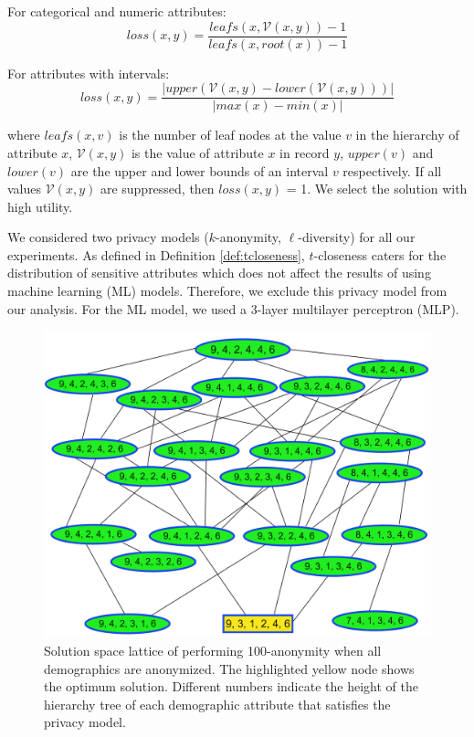 \documentclass{bioinfo}
\begin{document}
\begin{methods}
For categorical and numeric attributes:
$$loss(x,y) = \frac{leafs(x, \mathcal{V}(x,y)) - 1}{leafs(x, root(x)) - 1}$$

For attributes with intervals:
$$loss(x,y) = \frac{|upper(\mathcal{V}(x,y) - lower(\mathcal{V}(x,y)))|}{|max(x) - min(x)|}$$

where $leafs(x,v)$ is the number of leaf nodes at the value $v$ in the hierarchy of attribute $x$, $\mathcal{V}(x,y)$ is the value of attribute $x$ in record $y$, $upper(v)$ and $lower(v)$ are the upper and lower bounds of an interval $v$ respectively. If all values $\mathcal{V}(x,y)$ are suppressed, then $loss(x,y)$ = 1. We select the solution with high utility.

We considered two privacy models ($k$-anonymity, $\ell$-diversity) for all our experiments. As defined in Definition \ref{def:tcloseness}, $t$-closeness caters for the distribution of sensitive attributes which does not affect the results of using machine learning (ML) models. Therefore, we exclude this privacy model from our analysis. For the ML model, we used a 3-layer multilayer perceptron (MLP).

\begin{figure}[!tpb]%
\centerline{\includegraphics[width=\linewidth]{diagram-20210316F.png}}
\caption{Solution space lattice of performing 100-anonymity when all demographics are anonymized. The highlighted yellow node shows the optimum solution. Different numbers indicate the height of the hierarchy tree of each demographic attribute that satisfies the privacy model.}\label{solutionspacelattice}
\end{figure}





\end{methods}
\end{document}

